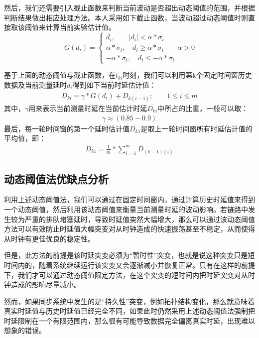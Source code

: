 然后，我们还需要引入截止函数来判断当前波动是否超出动态阈值的范围，并根据判断结果做出相应处理方法。本人采用如下截止函数，当波动超过动态阈值时则直接取该阈值来计算当前实验估计值。
\begin{equation}
G(d_{i}) = \left\{
	\begin{array}{lll} %
		d_{i}, \qquad \left | d_{i} \right | < \alpha * \sigma_{i} \\
		\alpha * \sigma_{i}, \quad d_{i} \geq \alpha * \sigma_{i} \\
		-\alpha * \sigma_{i}, \quad d_{i} \leq -\alpha * \sigma_{i}
	\end{array}
	\alpha > 0 \right. 
\end{equation}

基于上面的动态阈值与截止函数，在$t_{ki}$时刻，我们可以利用第k个固定时间窗历史数据及当前测量延时$d_{i}$得到如下当前时延估计值：
\begin{align}
\overline{D_{ki}} = \gamma * G(d_{i}) + \overline{D_{k(i-1)}}; \qquad 1\leq i \leq m
\end{align}
其中，$\gamma$用来表示当前测量时延在当前估计时延$\overline{D_{ki}}$中所占的比重，一般可以取：
\begin{align}
\gamma \approx (0.85-0.9)
\end{align}
最后，每一轮时间窗的第一个延时估计值$\overline{D_{k1}}$是取上一轮时间窗所有时延估计值的平均值，即：
\begin{align}
\overline{D_{k1}} = \frac{1}{m} * \sum_{i=1}^{m}\overline{D_{(k-1)(i)}}
\end{align}

\subsection{动态阈值法优缺点分析}
利用上述动态阈值法，我们可以通过在固定时间窗内，通过计算历史时延值来得到一个动态阈值，然后利用该动态阈值来衡量当前测量时延的波动影响。若链路中发生较为严重的排队堵塞延时，导致时延值突然大幅增大，那么可以通过该动态阈值方法可以有效防止时延值大幅突变对从时钟造成的快速振荡甚至不稳定，从而使得从时钟有更佳优良的稳定性。

但是，此方法的前提是该时延突变必须为“暂时性”突变，也就是说这种突变只是短时间内的，随着系统继续运行该突变又会逐渐减小并恢复正常。只有在这样的前提下，我们才可以通过动态阈值限定方法，在这个突变的短时间内把时延突变对从时钟造成的影响尽量减小。

然而，如果同步系统中发生的是“持久性”突变，例如拓扑结构变化，那么就意味着真实时延值与历史时延值已经完全不同，如果此时仍然采用上述动态阈值法强制把时延限制在一个有限范围内，那么很有可能导致数据完全偏离真实时延，出现难以想象的错误。

